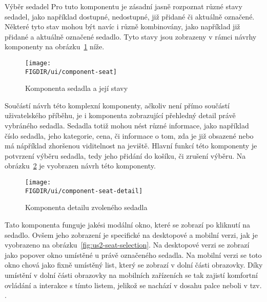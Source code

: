 \begin{subsection}{Výběr sedadel}
    Pro tuto komponentu je zásadní jasně rozpoznat různé stavy sedadel, jako například dostupné, nedostupné, již přidané či aktuálně označené.
    Některé tyto stav mohou být navíc i různě kombinovány, jako například již přidané a aktuálně označené sedadlo.
    Tyto stavy jsou zobrazeny v rámci návrhy komponenty  na obrázku~\ref{fig:component-seat} níže.

    \begin{figure}[H]
        \centering
        \texttt{[image: \\FIGDIR/ui/component-seat]}
        \caption{Komponenta sedadla a její stavy}
        \label{fig:component-seat}
    \end{figure}

    Součástí návrh této komplexní komponenty, ačkoliv není přímo součástí uživatelského příběhu, je i komponenta zobrazující přehledný detail právě vybráného sedadla.
    Sedadla totiž mohou nést různé informace, jako například číslo sedadla, jeho kategorie, cena, či informace o tom, zda je již obsazené nebo má nápříklad zhoršenou viditelnost na jeviště.
    Hlavní funkcí této komponenty je potvrzení výběru sedadla, tedy jeho přidání do košíku, či zrušení výběru.
    Na obrázku~\ref{fig:component-seat-} je vyobrazen návrh této komponenty.

    \begin{figure}[H]
        \centering
        \texttt{[image: \\FIGDIR/ui/component-seat-detail]}
        \caption{Komponenta detailu zvoleného sedadla}
        \label{fig:component-seat-}
    \end{figure}

    Tato komponenta funguje jakési modální okno, které se zobrazí po kliknutí na sedadlo.
    Ovšem jeho zobrazení je specifické na desktopové a mobilní verzi, jak je vyobrazeno na obrázku~\ref{fig:us2-seat-selection}.
    Na desktopové verzi se zobrazí jako popover okno umístěné u právě označeného sedadla.
    Na mobilní verzi se toto okno chová jako fixně umístěný list, který se zobrazí v dolní části obrazovky.
    Díky umístění v dolní části obrazovky na mobilních zařízeních se tak zajistí komfortní ovládání a interakce s tímto listem, jelikož se nachází v dosahu palce neboli v tzv. .
\end{subsection}

